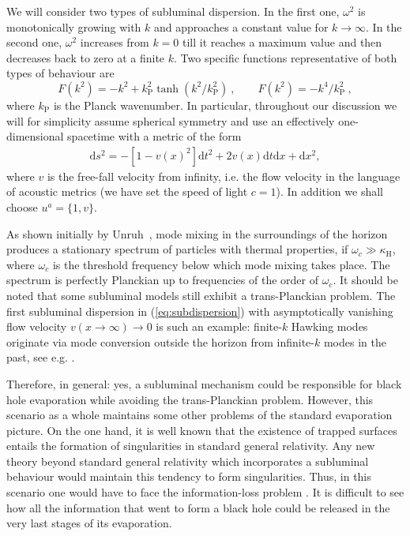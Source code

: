 \documentclass[11pt,a4paper]{article}
\newcommand{\diff}{\text{d}}
\begin{document}
We will consider two types of subluminal dispersion. In the first one, $\omega^2$
is monotonically growing with $k$ and approaches a constant value for 
$k \to
\infty$. In the second one, $\omega^2$ increases from $k=0$ till it reaches a
maximum value and then decreases back to zero at a finite $k$.
Two specific functions representative of both types of behaviour are
%
\begin{equation}
F(k^2)= -k^2 + k_\text{P}^2 \tanh(k^2/k_\text{P}^2)~,
\qquad
F(k^2)= - k^4/k_\text{P}^2~,
\label{eq:subdispersion}
\end{equation}
%
where $k_\text{P}$ is the Planck wavenumber. In particular, throughout our discussion
we will for simplicity assume spherical symmetry and use an effectively one-dimensional spacetime with a metric of the form 
\begin{align}
\diff s^2=-[1-v(x)^2]\diff t^2+2v(x)\diff t\diff x+\diff x^2,
\label{eq:hydrometric}
\end{align}
where $v$ is the free-fall velocity from infinity, i.e. the flow velocity in the language of acoustic metrics (we have set the speed of light $c=1$). In addition we shall choose  $u^a =\{1,v\}$.

As shown initially by Unruh~\cite{unruh-sub}, mode mixing in the surroundings of the horizon produces a stationary
spectrum of particles with thermal properties,  if $\omega_c \gg \kappa_\text{H}$,
where $\omega_c$ is the threshold frequency below which  mode mixing takes
place. The spectrum is perfectly
Planckian up to frequencies of the order of $\omega_c$.
It should be noted that some subluminal models still exhibit a trans-Planckian problem. The first subluminal dispersion in (\ref{eq:subdispersion}) with asymptotically vanishing flow velocity $v(x\to\infty)\to 0$  is such an example: finite-$k$ Hawking modes originate via mode conversion outside the horizon from infinite-$k$ modes in the past, see e.g. \cite{Jacobson:1999zk}.


Therefore, in general: yes, a subluminal mechanism could be responsible for black
hole evaporation while avoiding the trans-Planckian problem. However, this scenario as
a whole maintains some other problems of the standard evaporation picture. On the one hand, it is
well known that the existence of trapped surfaces entails the
formation of singularities in standard general relativity. Any new theory beyond
standard general relativity which incorporates a subluminal behaviour would maintain
this tendency to form singularities. Thus, in this scenario one would have to
face the information-loss problem \cite{hawking-info-loss}. It is difficult to see how all the information
that went to form a black hole could be released in the very last stages of its
evaporation. 
\end{document}
